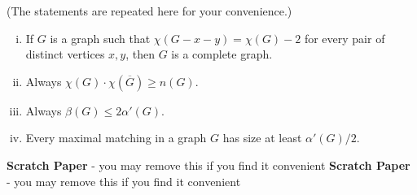 \documentclass[addpoints,10pt]{exam}
\begin{document}
\begin{questions}
\begin{enumerate}[(i)]
\end{enumerate}




\end{questions}

\newpage

(The statements are repeated here for your convenience.)
\begin{enumerate}[(i)]
\item %
If $G$ is a graph such that $\chi(G-x-y)=\chi(G)-2$ for every pair of distinct vertices $x,y$, then $G$ is a complete graph.
\item Always $\chi(G)\cdot \chi(\overline{G})\geq n(G)$.
\item %
Always $\beta(G)\leq 2\alpha'(G)$. %
\item %
Every maximal matching in a graph $G$ has size at least $\alpha'(G)/2$.
\end{enumerate}






\newpage
\textbf{Scratch Paper} - you may remove this if you find it convenient
\newpage
\textbf{Scratch Paper} - you may remove this if you find it convenient
\end{document}
